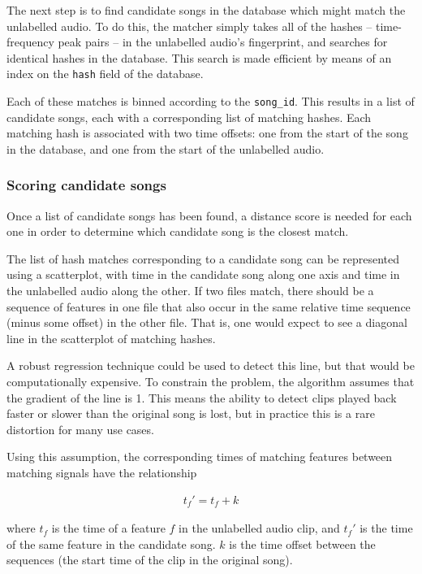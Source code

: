 \documentclass[12pt,a4paper,twoside,openright]{report}
\begin{document}
The next step is to find candidate songs in the database which might match the unlabelled audio. To do this, the matcher simply takes all of the hashes -- time-frequency peak pairs -- in the unlabelled audio's fingerprint, and searches for identical hashes in the database. This search is made efficient by means of an index on the \lstinline{hash} field of the database.

Each of these matches is binned according to the \lstinline{song_id}. This results in a list of candidate songs, each with a corresponding list of matching hashes. Each matching hash is associated with two time offsets: one  from the start of the song in the database, and one from the start of the unlabelled audio.

\subsubsection{Scoring candidate songs}

Once a list of candidate songs has been found, a distance score is needed for each one in order to determine which candidate song is the closest match.

The list of hash matches corresponding to a candidate song can be represented using a scatterplot, with time in the candidate song along one axis and time in the unlabelled audio along the other. If two files match, there should be a sequence of features in one file that also occur in the same relative time sequence (minus some offset) in the other file. That is, one would expect to see a diagonal line in the scatterplot of matching hashes.

A robust regression technique could be used to detect this line, but that would be computationally expensive. To constrain the problem, the algorithm assumes that the gradient of the line is 1. This means the ability to detect clips played back faster or slower than the original song is lost, but in practice this is a rare distortion for many use cases.

Using this assumption, the corresponding times of matching features between matching signals have the relationship

\begin{align*}
  t_f' = t_f + k 
\end{align*}

where $t_f$ is the time of a feature $f$ in the unlabelled audio clip, and $t_f'$ is the time of the same feature in the candidate song. $k$ is the time offset between the sequences (the start time of the clip in the original song).
\end{document}
